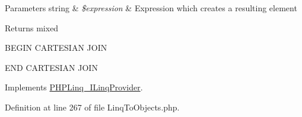\begin{DoxyParams}[1]{\-Parameters}
string & {\em \$expression} & \-Expression which creates a resulting element \\
\hline
\end{DoxyParams}
\begin{DoxyReturn}{\-Returns}
mixed 
\end{DoxyReturn}
\-B\-E\-G\-I\-N \-C\-A\-R\-T\-E\-S\-I\-A\-N \-J\-O\-I\-N

\-E\-N\-D \-C\-A\-R\-T\-E\-S\-I\-A\-N \-J\-O\-I\-N 

\-Implements \hyperlink{interface_p_h_p_linq___i_linq_provider_ad65fd69a356c5d75610ef1c5c8f9e3b1}{\-P\-H\-P\-Linq\-\_\-\-I\-Linq\-Provider}.



\-Definition at line 267 of file \-Linq\-To\-Objects.\-php.


